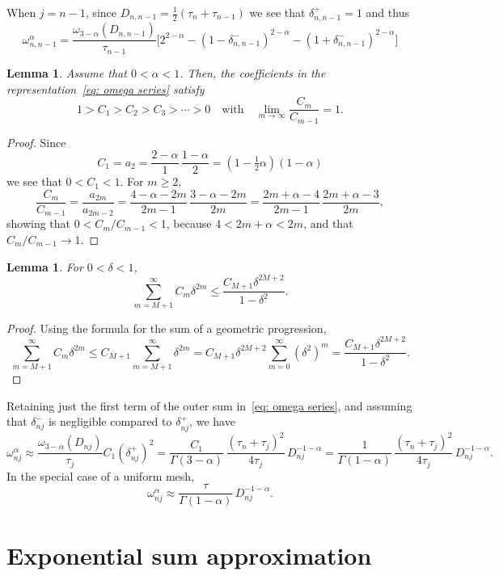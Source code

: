 \documentclass[a4paper,12pt]{article}
\newtheorem{lemma}[theorem]{Lemma}
\begin{document}
When $j=n-1$, since $D_{n,n-1}=\tfrac12(\tau_n+\tau_{n-1})$ we see that
$\delta_{n,n-1}^+=1$ and thus
\[
\omega^\alpha_{n,n-1}=\frac{\omega_{3-\alpha}(D_{n,n-1})}{\tau_{n-1}}
\bigl[
    2^{2-\alpha}-(1-\delta_{n,n-1}^-)^{2-\alpha}
    -(1+\delta_{n,n-1}^-)^{2-\alpha}\bigr]
\]

\begin{lemma}
Assume that $0<\alpha<1$. Then, the coefficients in the
representation~\eqref{eq: omega series} satisfy
\[
1>C_1>C_2>C_3>\cdots>0\quad\text{with}\quad
\lim_{m\to\infty}\frac{C_m}{C_{m-1}}=1.
\]
\end{lemma}
\begin{proof}
Since
\[
C_1=a_2=\frac{2-\alpha}{1}\,\frac{1-\alpha}{2}=(1-\tfrac12\alpha)(1-\alpha)
\]
we see that $0<C_1<1$.  For $m\ge2$,
\[
\frac{C_m}{C_{m-1}}=\frac{a_{2m}}{a_{2m-2}}
    =\frac{4-\alpha-2m}{2m-1}\,\frac{3-\alpha-2m}{2m}
    =\frac{2m+\alpha-4}{2m-1}\,\frac{2m+\alpha-3}{2m},
\]
showing that $0<C_m/C_{m-1}<1$, because $4<2m+\alpha<2m$, and that
$C_m/C_{m-1}\to1$.
\end{proof}

\begin{lemma}
For $0<\delta<1$,
\[
\sum_{m=M+1}^\infty C_m\delta^{2m}\le \frac{C_{M+1}\delta^{2M+2}}{1-\delta^2}.
\]
\end{lemma}
\begin{proof}
Using the formula for the sum of a geometric progression,
\[
\sum_{m=M+1}^\infty C_m\delta^{2m}\le C_{M+1}\sum_{m=M+1}^\infty\delta^{2m}
    =C_{M+1}\delta^{2M+2}\sum_{m=0}^\infty(\delta^2)^m
    =\frac{C_{M+1}\delta^{2M+2}}{1-\delta^2}.
\]
\end{proof}

Retaining just the first term of the outer sum in~\eqref{eq: omega series}, and
assuming that $\delta^-_{nj}$ is negligible compared to $\delta^+_{nj}$, we have
\[
\omega^\alpha_{nj}\approx
\frac{\omega_{3-\alpha}(D_{nj})}{\tau_j}C_1(\delta^+_{nj})^2
    =\frac{C_1}{\Gamma(3-\alpha)}\,
    \frac{(\tau_n+\tau_j)^2}{4\tau_j}\,D_{nj}^{-1-\alpha}
    =\frac{1}{\Gamma(1-\alpha)}\,
    \frac{(\tau_n+\tau_j)^2}{4\tau_j}\,D_{nj}^{-1-\alpha}.
\]
In the special case of a uniform mesh,
\[
\omega^\alpha_{nj}\approx\frac{\tau}{\Gamma(1-\alpha)}\,D_{nj}^{-1-\alpha}.
\]

\section{Exponential sum approximation}
\end{document}

